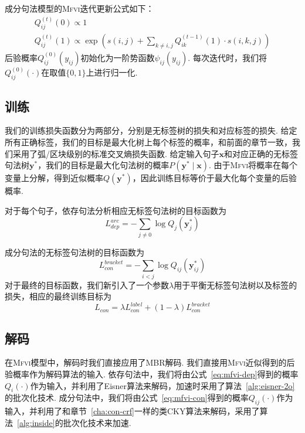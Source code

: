 成分句法模型的\textsc{Mfvi}迭代更新公式如下\citep{wang-etal-2019-second}：
\begin{equation}
  \label{eq:mfvi-con}
  \begin{array}{l}
    Q_{ij}^{(t)}(0)\propto 1 \\
    Q_{ij}^{(t)}(1)\propto \exp\left(s(i,j) +\sum_{k\neq i,j} Q_{ik}^{(t-1)}(1)\cdot s(i,k,j) \right)
  \end{array}
\end{equation}
后验概率$Q_{ij}^{(0)}(y_{ij})$初始化为一阶势函数$\psi_{ij}(y_{ij})$.
每次迭代时，我们将$Q_{ij}^{(0)}(\cdot)$在取值$\{0,1\}$上进行归一化.


\subsection{训练}

我们的训练损失函数分为两部分，分别是无标签树的损失和对应标签的损失.
给定所有正确标签，我们的目标是最大化树上每个标签的概率，和前面的章节一致，我们采用了弧/区块级别的标准交叉熵损失函数.
给定输入句子$\boldsymbol{x}$和对应正确的无标签句法树$\boldsymbol{y}^{\ast}$，我们的目标是最大化句法树的概率$P(\boldsymbol{y}^{\ast}\mid\boldsymbol{x})$.
由于\textsc{Mfvi}将概率在每个变量上分解，得到近似概率$Q(\boldsymbol{y}^{\ast})$，因此训练目标等价于最大化每个变量的后验概率.

对于每个句子，依存句法分析相应无标签句法树的目标函数为
\begin{equation}
  \label{eq:dep-vi-arc-loss}
  L_{dep}^{arc}=-\sum_{j\neq 0}\log Q_j(\boldsymbol{y}^{\ast}_j)
\end{equation}

成分句法的无标签句法树的目标函数为
\begin{equation}
  \label{eq:con-vi-bracket-loss}
  L_{con}^{bracket}=-\sum_{i<j}\log Q_{ij}(\boldsymbol{y}^{\ast}_{ij})
\end{equation}
对于最终的目标函数，我们新引入了一个参数$\lambda$用于平衡无标签句法树以及标签的损失，相应的最终训练目标为
\begin{equation}
  \label{eq:con-vi-loss}
  L_{con}=\lambda L_{con}^{label}+(1-\lambda)L_{con}^{bracket}
\end{equation}

\subsection{解码}
在\textsc{Mfvi}模型中，解码时我们直接应用了MBR解码.
我们直接用\textsc{Mfvi}近似得到的后验概率作为解码算法的输入.
依存句法中，我们将由公式~\ref{eq:mfvi-dep}得到的概率$Q_i(\cdot)$作为输入，并利用了Eisner算法来解码，加速时采用了算法~\ref{alg:eisner-2o}的批次化技术.
成分句法中，我们将由公式~\ref{eq:mfvi-con}得到的概率$Q_{ij}(\cdot)$作为输入，并利用了和章节~\ref{cha:con-crf}一样的类CKY算法来解码，采用了算法~\ref{alg:inside}的批次化技术来加速.


